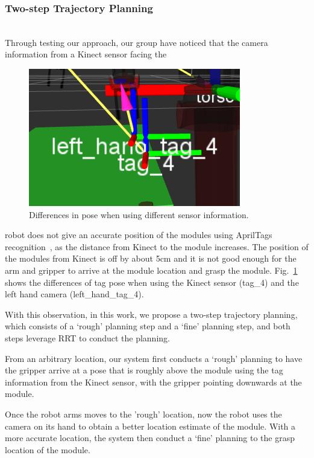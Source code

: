 \subsubsection {Two-step Trajectory Planning}~\\
Through testing our approach, our group have noticed that the camera information from a Kinect sensor facing the 
\begin{figure}
\begin{center}
\vspace{-8pt}
\includegraphics[width=0.45\columnwidth]{pics/kinect_tag_pose3_croped.png}
\caption{Differences in pose when using different sensor information.}
\label{fig:offTagPose}
\vspace{-12pt}
\end{center}
\end{figure}
robot does not give an accurate position of the modules using AprilTags recognition~\cite{Olson11},  
as the distance from Kinect to the module increases. 
The position of the modules from Kinect is off by about 5cm and it is not good enough for the arm and gripper to arrive at the module location and grasp the module. Fig.~\ref{fig:offTagPose} shows the differences of tag pose when using the Kinect sensor (tag\_4) and the left hand camera (left\_hand\_tag\_4).

With this observation, in this work, we propose a two-step trajectory planning, which consists of a `rough' planning step and a `fine' planning step, and both steps leverage RRT to conduct the planning. 

From an arbitrary location, our system first conducts a `rough' planning to have the gripper arrive at a pose that is roughly above the module using the tag information from the Kinect sensor, with the gripper pointing downwards at the module.

Once the robot arms moves to the 'rough' location, now the robot  uses the camera on its hand to obtain a better location estimate of the module. With a more accurate location, the system then conduct a `fine' planning to the grasp location of the module. 

